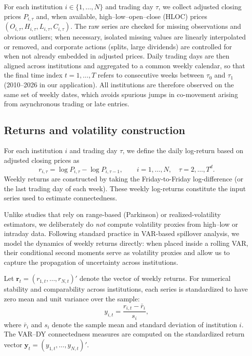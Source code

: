 

For each institution $i \in \{1,\dots,N\}$ and trading day $\tau$, we collect adjusted
closing prices $P_{i,\tau}$ and, when available, high--low--open--close (HLOC) prices
$(O_{i,\tau}, H_{i,\tau}, L_{i,\tau}, C_{i,\tau})$. The raw series are checked for
missing observations and obvious outliers; when necessary, isolated missing values are
linearly interpolated or removed, and corporate actions (splits, large dividends) are
controlled for when not already embedded in adjusted prices. Daily trading days are then
aligned across institutions and aggregated to a common weekly calendar, so that the final
time index $t = 1,\dots,T$ refers to consecutive weeks between $\tau_0$ and $\tau_1$
(2010--2026 in our application). All institutions are therefore observed on the same set
of weekly dates, which avoids spurious jumps in co-movement arising from asynchronous
trading or late entries.

\subsection{Returns and volatility construction}

For each institution $i$ and trading day $\tau$, we define the daily log-return based on
adjusted closing prices as
\begin{equation}
  r_{i,\tau}
  = \log P_{i,\tau} - \log P_{i,\tau-1},
  \qquad i = 1,\dots,N,\quad \tau = 2,\dots,T^d.
\end{equation}
Weekly returns are constructed by taking the Friday-to-Friday log-difference (or the last
trading day of each week). These weekly log-returns constitute the input series used to
estimate connectedness.

Unlike studies that rely on range-based (Parkinson) or realized-volatility estimators, we
deliberately do \emph{not} compute volatility proxies from high--low or intraday data.
Following standard practice in VAR-based spillover analysis, we model the dynamics of
weekly returns directly: when placed inside a rolling VAR, their conditional second
moments serve as volatility proxies and allow us to capture the propagation of
uncertainty across institutions.

Let $\mathbf{r}_t = (r_{1,t},\dots,r_{N,t})'$ denote the vector of weekly returns. For
numerical stability and comparability across institutions, each series is standardized to
have zero mean and unit variance over the sample:
\[
  y_{i,t} = \frac{r_{i,t} - \bar{r}_i}{s_i},
\]
where $\bar{r}_i$ and $s_i$ denote the sample mean and standard deviation of institution
$i$. The VAR--DY connectedness measures are computed on the standardized return vector
$\mathbf{y}_t = (y_{1,t},\dots,y_{N,t})'$.

